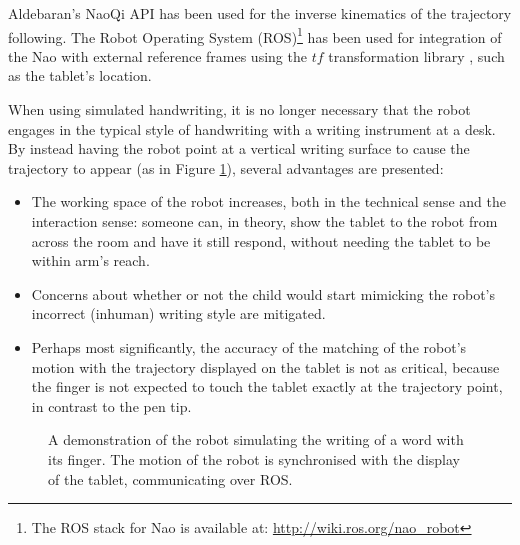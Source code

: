 \documentclass{sig-alternate}
\begin{document}
Aldebaran's NaoQi API has been used for the inverse kinematics of the trajectory
following. The Robot Operating System (ROS)\footnote{The ROS stack for Nao is
available at: \url{http://wiki.ros.org/nao_robot}} has been used for integration
of the Nao with external reference frames using the $tf$ transformation library
\cite{Foote2013}, such as the tablet's location.

When using simulated handwriting, it is no longer necessary that the robot
engages in the typical style of handwriting with a writing instrument at a desk.
By instead having the robot point at a vertical writing surface to cause the
trajectory to appear (as in Figure \ref{fig:naoWriting}), several advantages are
presented:

\begin{itemize}

    \item The working space of the robot increases, both in the technical sense
        and the interaction sense: someone can, in theory, show the tablet to
        the robot from across the room and have it still respond, without
        needing the tablet to be within arm's reach.

    \item Concerns about whether or not the child would start mimicking the
        robot's incorrect (inhuman) writing style are mitigated. %
%
%

    \item Perhaps most significantly, the accuracy of the matching of the
        robot's motion with the trajectory displayed on the tablet is not as
        critical, because the finger is not expected to touch the tablet exactly
        at the trajectory point, in contrast to the pen tip.

\end{itemize}

\begin{figure}[thpb]
     \begin{center}
%
    \end{center}
    \caption{A demonstration of the robot simulating the writing of a word
        with its finger. The motion of the robot is synchronised with the display of the tablet, communicating over ROS.
     }%

   \label{fig:naoWriting}
\end{figure}
\end{document}
